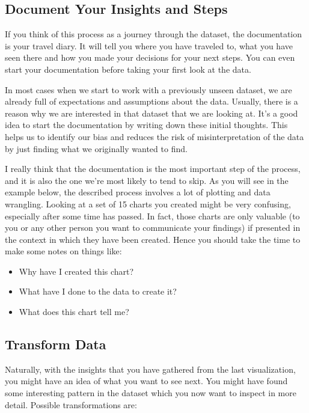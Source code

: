 \documentclass[]{book}
\providecommand{\tightlist}{%
  \setlength{\itemsep}{0pt}\setlength{\parskip}{0pt}}
\theoremstyle{definition}
\theoremstyle{definition}
\theoremstyle{definition}
\theoremstyle{remark}
\begin{document}
\subsection{Document Your Insights and
Steps}\label{document-your-insights-and-steps}

If you think of this process as a journey through the dataset, the
documentation is your travel diary. It will tell you where you have
traveled to, what you have seen there and how you made your decisions
for your next steps. You can even start your documentation before taking
your first look at the data.

In most cases when we start to work with a previously unseen dataset, we
are already full of expectations and assumptions about the data.
Usually, there is a reason why we are interested in that dataset that we
are looking at. It's a good idea to start the documentation by writing
down these initial thoughts. This helps us to identify our bias and
reduces the risk of misinterpretation of the data by just finding what
we originally wanted to find.

I really think that the documentation is the most important step of the
process, and it is also the one we're most likely to tend to skip. As
you will see in the example below, the described process involves a lot
of plotting and data wrangling. Looking at a set of 15 charts you
created might be very confusing, especially after some time has passed.
In fact, those charts are only valuable (to you or any other person you
want to communicate your findings) if presented in the context in which
they have been created. Hence you should take the time to make some
notes on things like:

\begin{itemize}
\tightlist
\item
  Why have I created this chart?
\item
  What have I done to the data to create it?
\item
  What does this chart tell me?
\end{itemize}

\subsection{Transform Data}\label{transform-data}

Naturally, with the insights that you have gathered from the last
visualization, you might have an idea of what you want to see next. You
might have found some interesting pattern in the dataset which you now
want to inspect in more detail. Possible transformations are:
\end{document}
